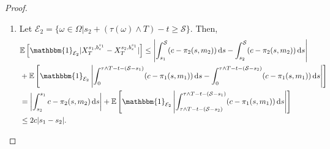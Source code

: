 \documentclass[a4paper]{scrartcl}
\theoremstyle{remark}
\theoremstyle{definition}
\numberwithin{equation}{section}
\newcommand*\diff{\mathop{}\!\mathrm{d}}
\newcommand{\ind}{\mathbbm{1}_}
\begin{document}
\begin{proof}
\begin{enumerate}
\begin{align*}
            &\quad \leq 2 L_h c|s_1-s_2|,
        \end{align*}
        by calculations similar to \eqref{eq:continuity_in_s}.
        \item %
        Let $\mathcal{E}_2=\{\omega \in \Omega|s_2 + (\tau(\omega) \wedge T)-t \geq \mathcal{S}\}$. Then,
         \begin{align*}
            &\mathbb{E}\left[\ind{\mathcal{E}_2}|X_T^{s_1,b_\varepsilon^{s_1}} - X_T^{s_2,b_\varepsilon^{s_1}}|\right] \leq \left|\int_{s_1}^{\mathcal{S}}(c- \pi_2(s,m_2))\diff s - \int_{s_2}^{\mathcal{S}}(c- \pi_2(s,m_2))\diff s\right|\\
            &+ \mathbb{E}\left[\ind{\mathcal{E}_2}\left|\int_{0}^{\tau \wedge T-t-(\mathcal{S}-s_1)}(c- \pi_1(s,m_1))\diff s - \int_{0}^{\tau \wedge T-t-(\mathcal{S}-s_2)}(c- \pi_1(s,m_1))\diff s\right|\right]\\
            &= \left|\int_{s_2}^{s_1}c-\pi_2(s,m_2)\diff s\right|
            + \mathbb{E}\left[\ind{\mathcal{E}_2}\left|\int_{\tau \wedge T-t-(\mathcal{S}-s_2)}^{\tau \wedge T-t-(\mathcal{S}-s_1)}(c- \pi_1(s,m_1))\diff s\right|\right]\\
         &  \leq 2c|s_1-s_2|.
        \end{align*}
        

\end{enumerate}
\end{proof}
\end{document}
